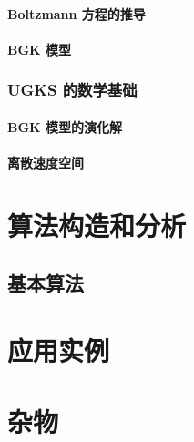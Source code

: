 \documentclass[hyperref,UTF8,titlepage]{ctexbook}
\begin{document}
\subsection{Boltzmann 方程的推导}

\subsection{BGK 模型}

\section{UGKS 的数学基础}

\subsection{BGK 模型的演化解}

\subsection{离散速度空间}

\part{算法构造和分析}
\chapter{基本算法}

\part{应用实例}

\part{杂物}







\end{document}

